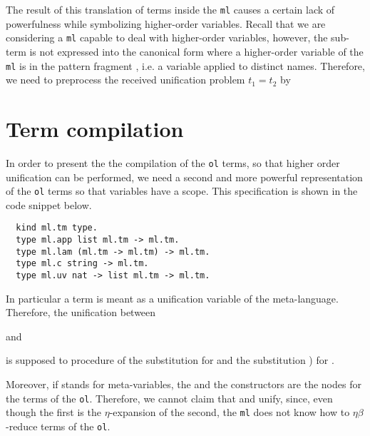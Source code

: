 \documentclass[sigconf,natbib=false]{acmart}
\newcommand*{\acronym}[1]{\texttt{#1}\xspace}
\def\ol{\acronym{ol}} %
\def\ml{\acronym{ml}} %
\begin{document}
The result of this translation of terms inside the \ml causes a certain lack of
powerfulness while symbolizing higher-order variables. Recall that we are
considering a \ml capable to deal with higher-order variables, however, the
sub-term  is not expressed into the canonical form where a
higher-order variable of the \ml is in the pattern fragment \cite{miller1991},
i.e. a variable applied to distinct names. Therefore, we need to preprocess the
received unification problem $t_1 = t_2$ by 
 
\section{Term compilation}

In order to present the the compilation of the \ol terms, so that higher order
unification can be performed, we need a second and more powerful representation
of the \ol terms so that variables have a scope. This specification is shown
in the code snippet below.  

\begin{verbatim}
  kind ml.tm type.
  type ml.app list ml.tm -> ml.tm.
  type ml.lam (ml.tm -> ml.tm) -> ml.tm.
  type ml.c string -> ml.tm.
  type ml.uv nat -> list ml.tm -> ml.tm.
\end{verbatim}

\noindent In particular a  term is meant as a unification variable
of the meta-language. Therefore, the unification between 


and


is supposed to procedure of the substitution  for  and the substitution ) for
.

Moreover, if  stands for meta-variables, the  and the
 constructors are the nodes for the terms of the \ol. Therefore, we
cannot claim that  and 
unify, since, even though the first is the $\eta$-expansion of the second, the
\ml does not know how to $\eta\beta$-reduce terms of the \ol.
\end{document}
